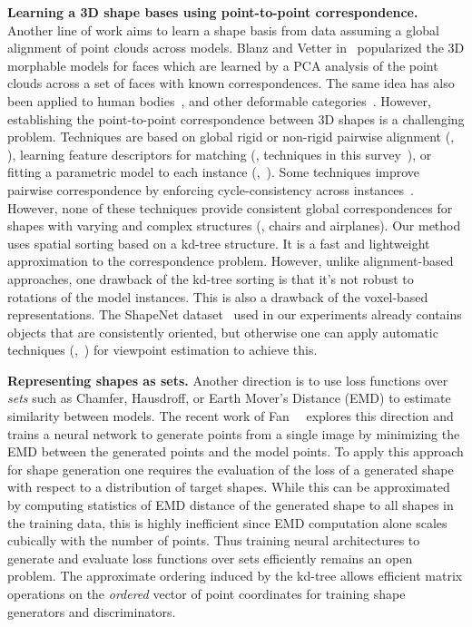 \vspace{8pt}
\noindent \textbf{Learning a 3D shape bases using point-to-point correspondence.} Another line of work aims to learn a shape basis from data assuming a global alignment of point clouds across models. 
Blanz and Vetter in~\cite{blanz1999morphable} popularized the 3D morphable models for faces which are learned by a PCA analysis of the point clouds across a set of faces with known correspondences. 
The same idea has also been applied to human bodies~\cite{allen2003space}, and other deformable categories~\cite{kar2015category}. 
However, establishing the point-to-point correspondence between 3D shapes is a challenging problem. 
Techniques are based on global rigid or non-rigid pairwise alignment (\eg, \cite{besl1992method,chen1992object,bronstein2010gromov}), learning feature descriptors for matching (\eg, techniques in this survey~\cite{van2011survey}), or fitting a parametric model to each instance (\eg,~\cite{cashman2013shape,prasad2010finding}).
Some techniques improve pairwise correspondence by enforcing cycle-consistency across instances~\cite{huang2013consistent}. 
However, none of these techniques provide consistent global correspondences for shapes with varying and complex structures (\eg, chairs and airplanes). 
Our method uses spatial sorting based on a kd-tree structure. It is a fast and lightweight approximation to the correspondence problem. However, unlike alignment-based approaches, one drawback of the kd-tree sorting is that it's not robust to rotations of the model instances. This is also a drawback of the voxel-based representations.
The ShapeNet dataset~\cite{chang2015shapenet} used in our experiments already contains objects that are consistently oriented, but otherwise one can apply automatic techniques (\eg,~\cite{Su_2015_ICCV}) for viewpoint estimation to achieve this.

\vspace{8pt}
\noindent \textbf{Representing shapes as sets.} Another direction is to use loss functions over \emph{sets} such as Chamfer, Hausdroff, or Earth Mover's Distance (EMD) to estimate similarity between models. The recent work of Fan~\etal~\cite{fan2016point} explores this direction and trains a neural network to generate points from a single image by minimizing the EMD between the generated points and the model points. To apply this approach for shape generation one requires the evaluation of the loss of a generated shape with respect to a distribution of target shapes. While this can be approximated by computing statistics of EMD distance of the generated shape to all shapes in the training data, this is highly inefficient since EMD computation alone scales cubically with the number of points. 
Thus training neural architectures to generate and evaluate loss functions over sets efficiently remains an open problem. 
The approximate ordering induced by the kd-tree allows efficient matrix operations on the \emph{ordered} vector of point coordinates for training shape generators and discriminators.

